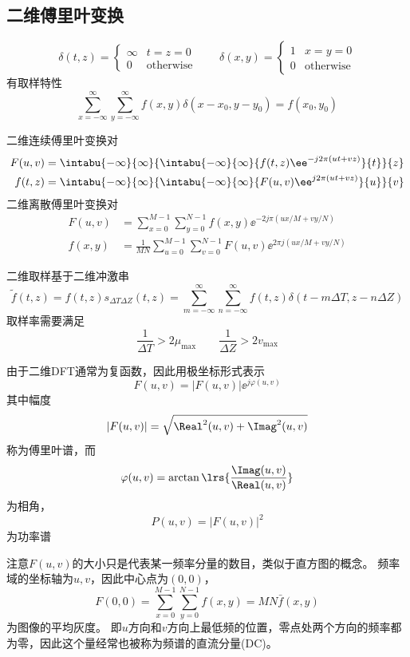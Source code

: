 \subsection{二维傅里叶变换}
\begin{definition}[二维冲激]
\[\delta(t,z)=\begin{cases}
\infty & t=z=0\\
0 & \text{otherwise}
\end{cases}\qquad
\delta(x,y)=\begin{cases}
1 & x=y=0\\
0 & \text{otherwise}
\end{cases}\]
有取样特性
\[\sum_{x=-\infty}^\infty\sum_{y=-\infty}^\infty f(x,y)\delta(x-x_0,y-y_0)=f(x_0,y_0)\]
\end{definition}
\begin{definition}[二维离散傅里叶变换]
二维连续傅里叶变换对
\[\begin{aligned}
F(u,v)&=\intabu{-\infty}{\infty}{\intabu{-\infty}{\infty}{f(t,z)\ee^{-j2\pi(ut+vz)}}{t}}{z}\\
f(t,z)&=\intabu{-\infty}{\infty}{\intabu{-\infty}{\infty}{F(u,v)\ee^{j2\pi(ut+vz)}}{u}}{v}
\end{aligned}\]
二维离散傅里叶变换对
\[\begin{aligned}
F(u,v)&=\sum_{x=0}^{M-1}\sum_{y=0}^{N-1}f(x,y)\ee^{-2j\pi (ux/M+vy/N)}\\
f(x,y)&=\frac{1}{MN}\sum_{u=0}^{M-1}\sum_{v=0}^{N-1}F(u,v)\ee^{2\pi j(ux/M+vy/N)}
\end{aligned}\]
\end{definition}
\begin{theorem}[二维采样定理]
二维取样基于二维冲激串
\[\tilde{f}(t,z)=f(t,z)s_{\Delta T\Delta Z}(t,z)=\sum_{m=-\infty}^{\infty}\sum_{n=-\infty}^{\infty}f(t,z)\delta(t-m\Delta T,z-n\Delta Z)\]
取样率需要满足
\[\frac{1}{\Delta T}>2\mu_{\max}\qquad\frac{1}{\Delta Z}>2v_{\max}\]
\end{theorem}
\begin{definition}[傅里叶谱和相角]
由于二维DFT通常为复函数，因此用极坐标形式表示
\[F(u,v)=|F(u,v)|\ee^{j\varphi(u,v)}\]
其中幅度
\[|F(u,v)|=\sqrt{\Real^2(u,v)+\Imag^2(u,v)}\]
称为傅里叶谱，而
\[\varphi(u,v)=\arctan\lrs{\frac{\Imag(u,v)}{\Real(u,v)}}\]
为相角，
\[P(u,v)=|F(u,v)|^2\]
为功率谱
\end{definition}

注意$F(u,v)$的大小只是代表某一频率分量的数目，类似于直方图的概念。
频率域的坐标轴为$u,v$，因此中心点为$(0,0)$，
\[F(0,0)=\sum_{x=0}^{M-1}\sum_{y=0}^{N-1}f(x,y)=MN\bar{f}(x,y)\]
为图像的平均灰度。
即$u$方向和$v$方向上最低频的位置，零点处两个方向的频率都为零，因此这个量经常也被称为频谱的直流分量(DC)。

